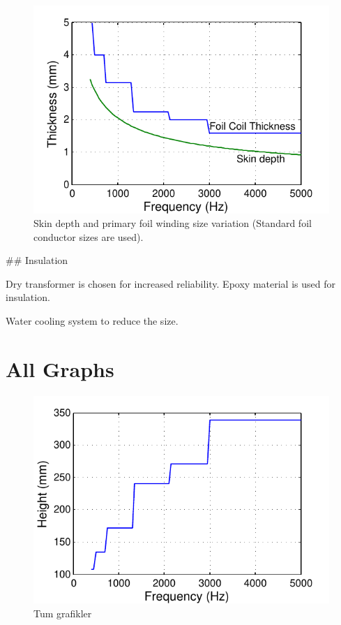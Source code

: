 \documentclass[a4paper, 11pt]{article} %
\begin{document}
\begin{figure}[]
  \centering
    \includegraphics[]{primary_thickness}
  \caption{Skin depth and primary foil winding size variation (Standard foil conductor sizes are used).}
  \label{primary_thickness}
\end{figure}

## Insulation 

Dry transformer is chosen for increased reliability. Epoxy material is used for insulation.

Water cooling system to reduce the size.


\section{All Graphs}

\begin{figure}[]
  \centering
    \includegraphics[]{primary_height}
  \caption{Tum grafikler}
  \label{primary_thickness}
\end{figure}
\end{document}

